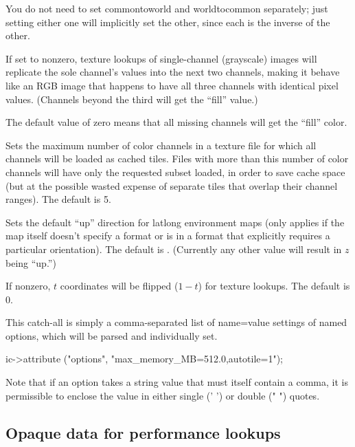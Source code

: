 You do not need to set {\cf commontoworld} and {\cf worldtocommon}
separately; just setting either one will implicitly set the other, since
each is the inverse of the other.
\apiend

If set to nonzero, texture lookups of single-channel (grayscale) 
images will replicate the sole channel's values into the next two
channels, making it behave like an RGB image that happens to have all
three channels with identical pixel values.  (Channels beyond the third
will get the ``fill'' value.)

The default value of zero means that all missing channels will get
the ``fill'' color.
\apiend

Sets the maximum number of color channels in a texture file for which all
channels will be loaded as cached tiles. Files with more than this number
of color channels will have only the requested subset loaded, in order
to save cache space (but at the possible wasted expense of separate tiles
that overlap their channel ranges). The default is 5.
\apiend

Sets the default ``up'' direction for latlong environment maps (only
applies if the map itself doesn't specify a format or is in a format
that explicitly requires a particular orientation).  The default is
.  (Currently any other value will result in $z$ being ``up.'')
\apiend

If nonzero, $t$ coordinates will be flipped ($1-t$) for texture lookups.
The default is 0.
\apiend

This catch-all is simply a comma-separated list of {\cf name=value}
settings of named options, which will be parsed and individually set.
\begin{code}
        ic->attribute ("options", "max_memory_MB=512.0,autotile=1");
\end{code}
Note that if an option takes a string value that must itself contain a
comma, it is permissible to enclose the value in either single ({\cf ' '})
or double ({\cf " "}) quotes.
\apiend



\subsection{Opaque data for performance lookups}
\label{sec:texturesys:api:opaque}

 

